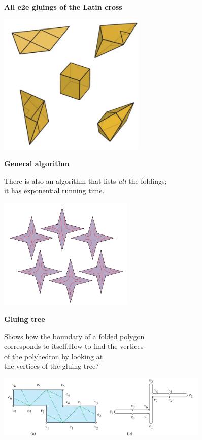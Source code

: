 \documentclass[11pt,a4paper]{extarticle}
\begin{document}
{\large \bf All e2e gluings of the Latin cross}

\begin{center}
	\includegraphics[width=7cm]{minilec/latincross}
\end{center}

{\large \bf General algorithm} \vspace{-2mm}

There is also an algorithm that lists {\it all} the foldings; \\
it has exponential running time. \vspace{-5mm}

\begin{center}
	\includegraphics[height=5.3cm]{minilec/4star}
\end{center}

{\large \bf Gluing tree} \vspace{-3mm}

Shows how the boundary of a folded polygon \\
corresponds to itself.\quad How to find the vertices \\
of the polyhedron by looking at \\
the vertices of the gluing tree?

\begin{center}
	\includegraphics[height=3cm]{minilec/gtreerec}
\end{center}
\end{document}
